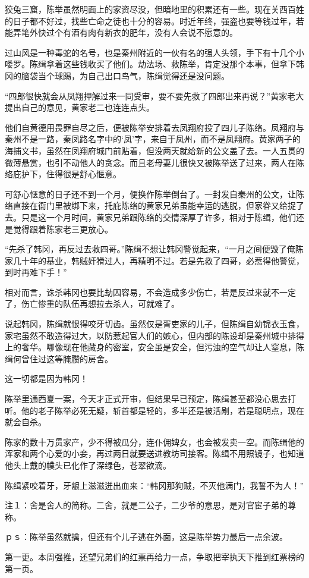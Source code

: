 狡兔三窟，陈举虽然明面上的家资尽没，但暗地里的积累还有一些。现在关西百姓的日子都不好过，找些亡命之徒也十分的容易。时近年终，强盗也要等钱过年，若能弄笔外快过个有酒有肉有新衣的肥年，没有人会说不愿意的。

过山风是一种毒蛇的名号，也是秦州附近的一伙有名的强人头领，手下有十几个小喽罗。陈缉拿着这些钱收买了他们。劫法场、救陈举，肯定没那个本事，但拿下韩冈的脑袋当个球踢，为自己出口鸟气，陈缉觉得还是没问题。

“四郎很快就会从凤翔押解过来一同受审，要不要先救了四郎出来再说？”黄家老大提出自己的意见，黄家老二也连连点头。

他们自黄德用畏罪自尽之后，便被陈举安排着去凤翔府投了四儿子陈络。凤翔府与秦州不是一路，秦凤路名字中的‘凤’字，来自于凤州，而不是凤翔府。黄家两子的海捕文书，虽然在凤翔府城门前贴着，但没两天就给新的公文盖了去。一人五贯的微薄悬赏，也引不动他人的贪念。而且老母妻儿很快又被陈举送了过来，两人在陈络庇护下，住得很是舒心惬意。

可舒心惬意的日子还不到一个月，便换作陈举倒台了。一封发自秦州的公文，让陈络直接在衙门里被绑下来，托庇陈络的黄家兄弟虽能幸运的逃脱，但家眷又给捉了去。只是这一个月时间，黄家兄弟跟陈络的交情深厚了许多，相对于陈缉，他们还是觉得跟着陈家老三更放心。

“先杀了韩冈，再反过去救四哥。”陈缉不想让韩冈警觉起来，“一月之间便毁了俺陈家几十年的基业，韩贼奸猾过人，再精明不过。若是先救了四哥，必惹得他警觉，到时再难下手！”

相对而言，诛杀韩冈也要比劫囚容易，不会造成多少伤亡，若是反过来就不一定了，伤亡惨重的队伍再想拉去杀人，可就难了。

说起韩冈，陈缉就恨得咬牙切齿。虽然仅是胥吏家的儿子，但陈缉自幼锦衣玉食，家宅虽然不敢造得过大，以防惹起官人们的嫉心，但内部的陈设却是秦州城中排得上的奢华。哪像现在他藏身的密室，安全虽是安全，但污浊的空气却让人窒息，陈缉何曾住过这等腌臜的房舍。

这一切都是因为韩冈！

陈举里通西夏一案，今天才正式开审，但结果早已预定，陈缉甚至都没心思去打听。他的老子陈举必死无疑，斩首都是轻的，多半还是被活剐，若是聪明点，现在就会自杀。

陈家的数十万贯家产，少不得被瓜分，连仆佣婢女，也会被发卖一空。而陈缉他的浑家和两个心爱的小妾，再过两日就要送进教坊司接客。陈缉不用照镜子，也知道他头上戴的幞头已化作了深绿色，苍翠欲滴。

陈缉紧咬着牙，牙龈上滋滋迸出血来：“韩冈那狗贼，不灭他满门，我誓不为人！”

注１：舍是舍人的简称。二舍，就是二公子，二少爷的意思，是对官宦子弟的尊称。

ｐｓ：陈举虽然就擒，但还有个儿子逃在外面，这是陈举势力最后一点余波。

第一更。本周强推，还望兄弟们的红票再给力一点，争取把宰执天下推到红票榜的第一页。

